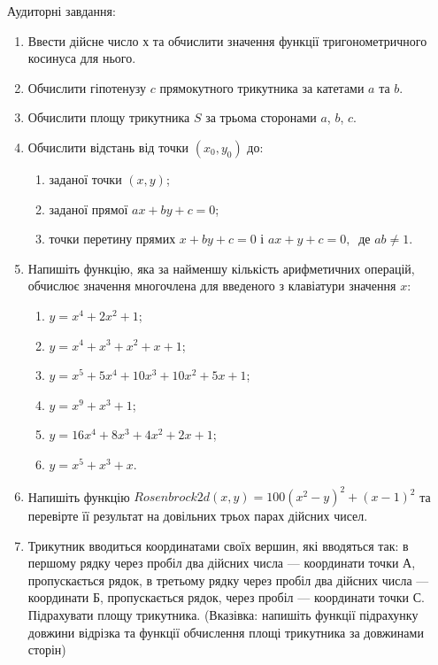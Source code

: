 \documentclass[]{article}
\makeatletter
\newcommand{\xslalph}[1]{\expandafter\@xslalph\csname c@#1\endcsname}
\newcommand{\@xslalph}[1]{%
    \ifcase#1\or а\or б\or в\or г\or д\or e\or є\or ж\or з\or i%
    \or й\or к\or л\or м\or н\or о\or п\or р\or с\or т%
    \or у\or ф\or х\or ц\or ч\or ш\or ю\or я\or аа\or бб\or вв%
    \else\@ctrerr\fi%
}
\makeatother
\begin{document}
Аудиторні завдання:

\begin{enumerate}
\def\labelenumi{\arabic{enumi})}
\item
  Ввести дійсне число х та обчислити значення функції тригонометричного
  косинуса для нього.
\item
  Обчислити гіпотенузу $c$ прямокутного трикутника за катетами
  $a$ та $b$.
\item
  Обчислити площу трикутника $S$ за трьома сторонами $a$,
  $b$, $c$.
\item
  Обчислити відстань від точки \((x_{0},y_{0})\) до:
\begin{enumerate}[label=\xslalph*)]
\item заданої точки \((x,y)\);
\item заданої прямої \(ax + by + c = 0\);
\item точки перетину прямих \(x + by + c = 0\) і
\(ax + y + c = 0,\ \) де 
\(ab \neq 1\).
\end{enumerate}

\item
  Напишіть функцію, яка за найменшу кількість арифметичних операцій,
  обчислює значення многочлена для введеного з клавіатури значення
  $x$:
  \begin{enumerate}[label=\xslalph*)]
  \item \(y = x^{4} + 2x^{2} + 1\); 
  \item \(y = x^{4} + x^{3} + x^{2} + x + 1\);
  \item \(y = x^{5} + 5x^{4} + 10x^{3} + 10x^{2} + 5x + 1\);
  \item \(y = x^{9} + x^{3} + 1\);
  \item \(y = 16x^{4} + 8x^{3} + 4x^{2} + 2x + 1\); 
  \item \(y = x^{5} + x^{3} + x\).
  \end{enumerate}

\item
  Напишіть функцію $ Rosenbrock2d(x,y) = 100(x^{2} - y)^{2} + (x - 1)^{2}$ та перевірте її результат на
  довільних трьох парах дійсних чисел.

\item
  Трикутник вводиться координатами своїх вершин, які вводяться так: в
  першому рядку через пробіл два дійсних числа --- координати точки А,
  пропускається рядок, в третьому рядку через пробіл два дійсних числа
  --- координати Б, пропускається рядок, через пробіл --- координати
  точки С. Підрахувати площу трикутника. (Вказівка: напишіть функції
  підрахунку довжини відрізка та функції обчислення площі трикутника за
  довжинами сторін)
\end{enumerate}
\end{document}
